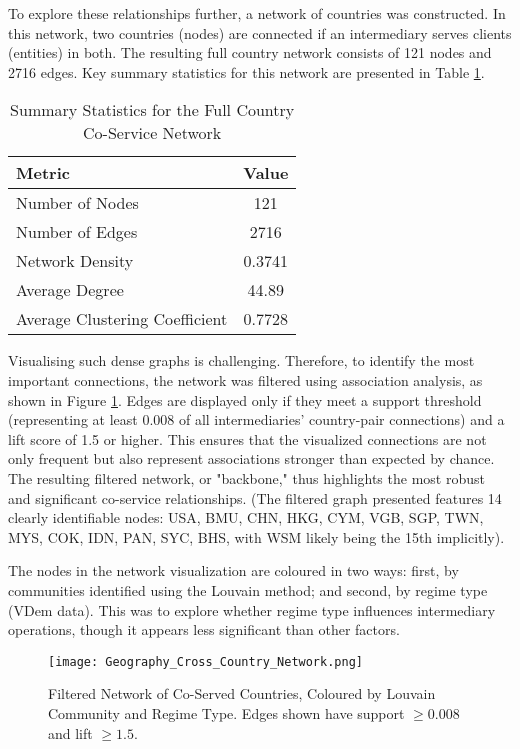 To explore these relationships further, a network of countries was constructed. In this network, two countries (nodes) are connected if an intermediary serves clients (entities) in both. The resulting full country network consists of 121 nodes and 2716 edges. Key summary statistics for this network are presented in Table \ref{tab:country_network_summary}.

\begin{table}[htbp]
\centering
\caption{Summary Statistics for the Full Country Co-Service Network}
\label{tab:country_network_summary}

\begin{tabular}{lc}
\toprule
Metric                        & Value    \\
\midrule
Number of Nodes               & 121      \\
Number of Edges               & 2716     \\
Network Density               & 0.3741   \\
Average Degree                & 44.89    \\
Average Clustering Coefficient & 0.7728   \\
\bottomrule
\end{tabular}
\end{table}

Visualising such dense graphs is challenging. Therefore, to identify the most important connections, the network was filtered using association analysis, as shown in Figure \ref{fig:geography_cross_country_network}. Edges are displayed only if they meet a support threshold (representing at least 0.008 of all intermediaries' country-pair connections) and a lift score of 1.5 or higher. This ensures that the visualized connections are not only frequent but also represent associations stronger than expected by chance. The resulting filtered network, or "backbone," thus highlights the most robust and significant co-service relationships. (The filtered graph presented features 14 clearly identifiable nodes: USA, BMU, CHN, HKG, CYM, VGB, SGP, TWN, MYS, COK, IDN, PAN, SYC, BHS, with WSM likely being the 15th implicitly).

The nodes in the network visualization are coloured in two ways: first, by communities identified using the Louvain method; and second, by regime type (VDem data). This was to explore whether regime type influences intermediary operations, though it appears less significant than other factors.

\begin{figure}[htbp]
    \centering
    \texttt{[image: Geography\_Cross\_Country\_Network.png]}
    \caption{Filtered Network of Co-Served Countries, Coloured by Louvain Community and Regime Type. Edges shown have support $\ge 0.008$ and lift $\ge 1.5$.}
    \label{fig:geography_cross_country_network}
\end{figure}

